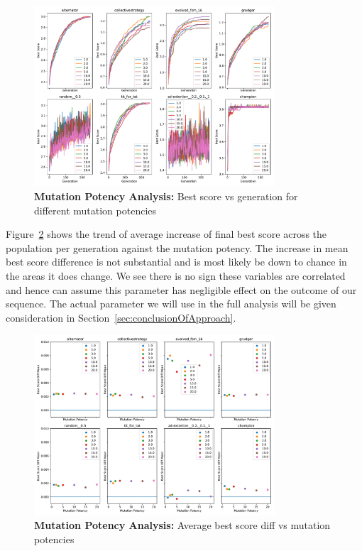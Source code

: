\begin{figure}[h]
    \includegraphics[width=0.8\textwidth, keepaspectratio, center]{./img/plots/MUT_POT_bs_v_gen_all.pdf}
    \caption{\textbf{Mutation Potency Analysis:} Best score vs generation for different mutation potencies}\label{fig:MUT-POT-bs-v-gen-all}
\end{figure}

Figure~\ref{fig:MUT-POT-bs-diff-v-pot-all} shows the trend of average increase of final best score across the population per generation against the mutation potency.
The increase in mean best score difference is not substantial and is most likely be down to chance in the areas it does change.
We see there is no sign these variables are correlated and hence can assume this parameter has negligible effect on the outcome of our sequence.
The actual parameter we will use in the full analysis will be given consideration in Section~\ref{sec:conclusionOfApproach}.

\begin{figure}[h]
    \includegraphics[width=0.8\textwidth, keepaspectratio, center]{./img/plots/MUT_POT_bs_diff_v_pot_all.pdf}
    \caption{\textbf{Mutation Potency Analysis:} Average best score diff vs mutation potencies}\label{fig:MUT-POT-bs-diff-v-pot-all}
\end{figure}


